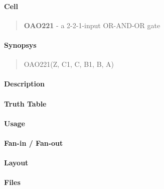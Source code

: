 \label{OAO221}
\paragraph{Cell}
\begin{quote}
    \textbf{OAO221} - a 2-2-1-input OR-AND-OR gate
\end{quote}

\paragraph{Synopsys}
\begin{quote}
    OAO221(Z, C1, C, B1, B, A)
\end{quote}

\paragraph{Description}

%

\paragraph{Truth Table}
%

\paragraph{Usage}

\paragraph{Fan-in / Fan-out}

\paragraph{Layout}

\paragraph{Files}

